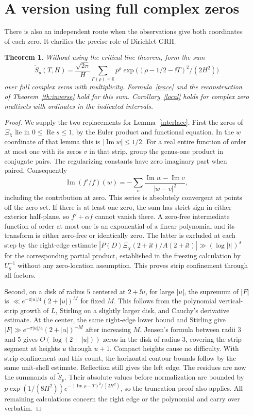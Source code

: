 \documentclass[11pt,letterpaper]{article}
\newtheorem{theorem}{Theorem}
\newcommand{\rpart}{\operatorname{Re}}\newcommand{\ipart}{\operatorname{Im}}
\begin{document}
\section{A version using full complex zeros}
There is also an independent route when the observations give both
coordinates of each zero. It clarifies the precise role of Dirichlet GRH.
\begin{theorem}\label{complex}
Without using the critical-line theorem, form the sum
\[
 \widetilde S_p(T,H)=\frac{\sqrt{2\pi}}{H}
 \sum_{F(\rho)=0}p^\rho\exp\big((\rho-1/2-\ii T)^2/(2H^2)\big)
\]
over full complex zeros with multiplicity. Formula~\eqref{trace} and
the reconstruction of Theorem~\ref{th:inverse} hold for this sum.
Corollary~\ref{local} holds for complex zero multisets with ordinates
in the indicated intervals.
\end{theorem}
\begin{proof}
We supply the two replacements for Lemma~\ref{interlace}. First the
zeros of $\Xi_\chi$ lie in $0\le\rpart s\le1$, by the Euler product and
functional equation. In the $w$ coordinate of that lemma this is
$|\ipart w|\le1/2$. For a real entire function of order at most one
with its zeros $v$ in that strip, group the genus-one product in conjugate
pairs. The regularizing constants have zero imaginary part when paired.
Consequently
\[
 \ipart(f'/f)(w)=-\sum_v\frac{\ipart w-\ipart v}{|w-v|^2},
\]
including the contribution at zero. This series is absolutely convergent
at points off the zero set. If there is at least one zero, the sum has
strict sign in either exterior half-plane, so $f'+\alpha f$ cannot vanish
there. A zero-free intermediate function of order at most one is an
exponential of a linear polynomial and its transform is either zero-free
or identically zero. The latter is excluded at each step by the right-edge
estimate $|P(D)\Xi_\chi(2+\ii t)/A(2+\ii t)|\gg(\log |t|)^d$ for the
corresponding partial product, established in the freezing calculation
by $U_g^{-1}$ without any zero-location assumption. This proves strip
confinement through all factors.

Second, on a disk of radius $5$ centered at $2+\ii u$, for large $|u|$,
the supremum of $|F|$ is $\ll e^{-\pi|u|/4}(2+|u|)^M$ for fixed $M$.
This follows from the polynomial vertical-strip growth of $L$, Stirling
on a slightly larger disk, and Cauchy's derivative estimate. At the
center, the same right-edge lower bound and Stirling give
$|F|\gg e^{-\pi|u|/4}(2+|u|)^{-M}$ after increasing $M$.
Jensen's formula between radii $3$ and $5$ gives $O(\log(2+|u|))$
zeros in the disk of radius $3$, covering the strip segment at heights
$u$ through $u+1$. Compact heights cause no difficulty. With strip
confinement and this count, the horizontal contour bounds follow by the
same unit-shell estimate. Reflection still gives the left edge.
The residues are now the summands of $\widetilde S_p$. Their absolute
values before normalization are bounded by
$p\exp(1/(8H^2))e^{-(\ipart\rho-T)^2/(2H^2)}$, so the truncation
proof also applies. All remaining calculations concern the right edge
or the polynomial and carry over verbatim.
\end{proof}
\end{document}
